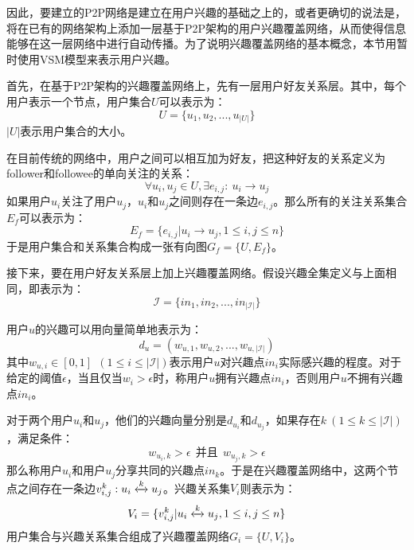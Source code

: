 因此，要建立的P2P网络是建立在用户兴趣的基础之上的，或者更确切的说法是，将在已有的网络架构上添加一层基于P2P架构的用户兴趣覆盖网络，从而使得信息能够在这一层网络中进行自动传播。为了说明兴趣覆盖网络的基本概念，本节用暂时使用VSM模型来表示用户兴趣。

首先，在基于P2P架构的兴趣覆盖网络上，先有一层用户好友关系层。其中，每个用户表示一个节点，用户集合$U$可以表示为：
\begin{equation*}
  U=\{u_1,u_2,...,u_{|U|}\}
\end{equation*}
$|U|$表示用户集合的大小。

在目前传统的网络中，用户之间可以相互加为好友，把这种好友的关系定义为follower和followee的单向关注的关系：
\begin{equation*}
  \forall u_i,u_j \in U, \exists e_{i,j}:~u_i \to u_j
\end{equation*}
如果用户$u_i$关注了用户$u_j$，$u_i$和$u_j$之间则存在一条边$e_{i,j}$。那么所有的关注关系集合$E_f$可以表示为：
\begin{equation*}
  E_f=\{e_{i,j}|u_i\to u_j,1\le i,j\le n\}
\end{equation*}
于是用户集合和关系集合构成一张有向图$G_f=\{U,E_f\}$。

接下来，要在用户好友关系层上加上兴趣覆盖网络。假设兴趣全集定义与上面相同，即表示为：
\begin{equation*}
  \mathcal{I}=\{in_1,in_2,...,in_{|\mathcal{I}|}\}
\end{equation*}

用户$u$的兴趣可以用向量简单地表示为：
\begin{equation*}
  d_u=(w_{u,1},w_{u,2},...,w_{u,|\mathcal{I}|})
\end{equation*}
其中$w_{u,i}\in [0,1]~~(1\le i\le |\mathcal{I}|)$表示用户$u$对兴趣点$in_i$实际感兴趣的程度。对于给定的阈值$\epsilon$，当且仅当$w_i>\epsilon$时，称用户$u$拥有兴趣点$in_i$，否则用户$u$不拥有兴趣点$in_i$。

对于两个用户$u_i$和$u_j$，他们的兴趣向量分别是$d_{u_i}$和$d_{u_j}$，如果存在$k~(1\le k\le |\mathcal{I}|)$，满足条件：
\begin{equation*}
  w_{u_i,k}>\epsilon~~\mbox{并且}~~w_{u_j,k}>\epsilon
\end{equation*}
那么称用户$u_i$和用户$u_j$分享共同的兴趣点$in_k$。于是在兴趣覆盖网络中，这两个节点之间存在一条边$v_{i,j}^k:u_i\xleftrightarrow{k} u_j$。兴趣关系集$V_i$则表示为：
\begin{equation*}
  V_i=\{v_{i,j}^{k}|u_i\xleftrightarrow{k} u_j,1\le i,j\le n\}
\end{equation*}
用户集合与兴趣关系集合组成了兴趣覆盖网络$G_i=\{U,V_i\}$。

